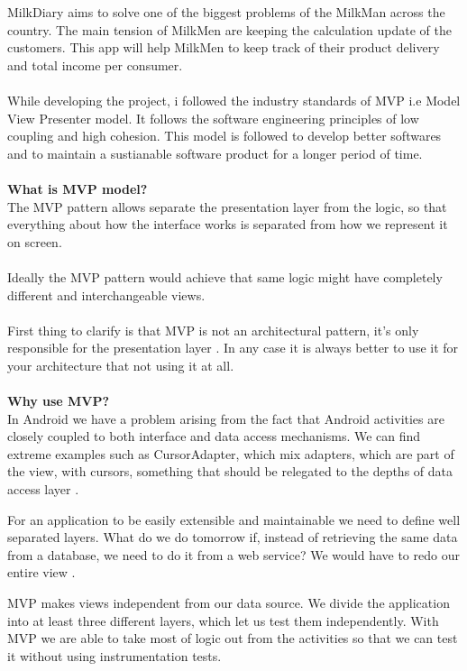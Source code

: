 MilkDiary aims to solve one of the biggest problems of the MilkMan across the country. The main tension of MilkMen are keeping the calculation update of the customers. This app will help MilkMen to keep track of their product delivery and total income per consumer. \\
\\
While developing the project, i followed the industry standards of MVP i.e Model View Presenter model. It follows the software engineering principles of low coupling and high cohesion. This model is followed to develop better softwares and to maintain a sustianable software product for a longer period of time.\\
\\
\textbf{What is MVP model?}\\
The MVP pattern allows separate the presentation layer from the logic, so that everything about how the interface works is separated from how we represent it on screen. \\
\\
Ideally the MVP pattern would achieve that same logic might have completely different and interchangeable views.\\
\\
First thing to clarify is that MVP is not an architectural pattern, it’s only responsible for the presentation layer . In any case it is always better to use it for your architecture that not using it at all.\\
\\
\textbf{Why use MVP?}\\
In Android we have a problem arising from the fact that Android activities are closely coupled to both interface and data access mechanisms. We can find extreme examples such as CursorAdapter, which mix adapters, which are part of the view, with cursors, something that should be relegated to the depths of data access layer .

For an application to be easily extensible and maintainable we need to define well separated layers. What do we do tomorrow if, instead of retrieving the same data from a database, we need to do it from a web service? We would have to redo our entire view .

MVP makes views independent from our data source. We divide the application into at least three different layers, which let us test them independently. With MVP we are able to take most of logic out from the activities so that we can test it without using instrumentation tests.\\

